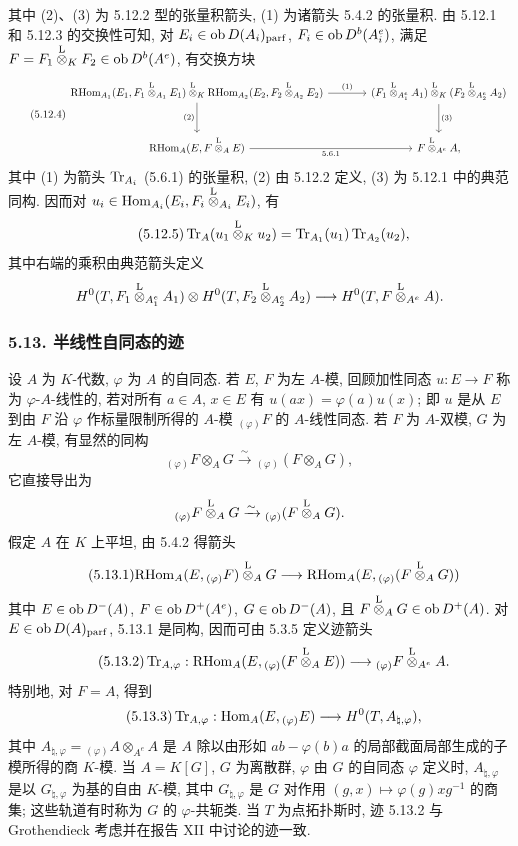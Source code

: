 其中 (2)、(3) 为 5.12.2 型的张量积箭头, (1) 为诸箭头 5.4.2 的张量积. 由 5.12.1 和 5.12.3 的交换性可知, 对 $E_i\in\operatorname{ob} D(A_i)_{\mathrm{parf}}$, $F_i\in\operatorname{ob} D^b(A_i^e)$, 满足 $F=F_1\overset{\mathrm L}{\otimes}_KF_2\in\operatorname{ob} D^b(A^e)$, 有交换方块
\begin{equation}\tag{5.12.4}
\begin{tikzcd}[column sep=large,row sep=large]
\RHom_{A_1}(E_1,F_1\lten_{A_1}E_1)\lten_K\RHom_{A_2}(E_2,F_2\lten_{A_2}E_2) \arrow[r,"(1)"] \arrow[d,"(2)"'] & (F_1\lten_{A_1^e}A_1)\lten_K(F_2\lten_{A_2^e}A_2) \arrow[d,"(3)"]\\
\RHom_A(E,F\lten_AE) \arrow[r,"5.6.1"'] & F\lten_{A^e}A,
\end{tikzcd}
\end{equation}
其中 (1) 为箭头 $\operatorname{Tr}_{A_i}$ (5.6.1) 的张量积, (2) 由 5.12.2 定义, (3) 为 5.12.1 中的典范同构. 因而对 $u_i\in\operatorname{Hom}_{A_i}(E_i,F_i\overset{\mathrm L}{\otimes}_{A_i}E_i)$, 有
\begin{equation}\tag{5.12.5}
\operatorname{Tr}_A(u_1\overset{\mathrm L}{\otimes}_Ku_2)=\operatorname{Tr}_{A_1}(u_1)\operatorname{Tr}_{A_2}(u_2),
\end{equation}
其中右端的乘积由典范箭头定义
\[
H^0(T,F_1\overset{\mathrm L}{\otimes}_{A_1^e}A_1)\otimes H^0(T,F_2\overset{\mathrm L}{\otimes}_{A_2^e}A_2)
\longrightarrow H^0(T,F\overset{\mathrm L}{\otimes}_{A^e}A).
\]

\subsubsection*{5.13. 半线性自同态的迹}

设 $A$ 为 $K$-代数, $\varphi$ 为 $A$ 的自同态. 若 $E$, $F$ 为左 $A$-模, 回顾加性同态 $u:E\to F$ 称为 $\varphi$-$A$-线性的, 若对所有 $a\in A$, $x\in E$ 有 $u(ax)=\varphi(a)u(x)$; 即 $u$ 是从 $E$ 到由 $F$ 沿 $\varphi$ 作标量限制所得的 $A$-模 ${}_{(\varphi)}F$ 的 $A$-线性同态. 若 $F$ 为 $A$-双模, $G$ 为左 $A$-模, 有显然的同构
\[
{}_{(\varphi)}F\otimes_AG\xrightarrow{\sim}{}_{(\varphi)}(F\otimes_AG),
\]
它直接导出为
\[
{}_{(\varphi)}F\overset{\mathrm L}{\otimes}_AG\xrightarrow{\sim}{}_{(\varphi)}(F\overset{\mathrm L}{\otimes}_AG).
\]
假定 $A$ 在 $K$ 上平坦, 由 5.4.2 得箭头
\begin{equation}\tag{5.13.1}
\mathrm{RHom}_A(E,{}_{(\varphi)}F)\overset{\mathrm L}{\otimes}_AG\longrightarrow\mathrm{RHom}_A(E,{}_{(\varphi)}(F\overset{\mathrm L}{\otimes}_AG))
\end{equation}
其中 $E\in\operatorname{ob} D^-(A)$, $F\in\operatorname{ob} D^+(A^e)$, $G\in\operatorname{ob} D^-(A)$, 且 $F\overset{\mathrm L}{\otimes}_AG\in\operatorname{ob} D^+(A)$. 对 $E\in\operatorname{ob} D(A)_{\mathrm{parf}}$, 5.13.1 是同构, 因而可由 5.3.5 定义迹箭头
\begin{equation}\tag{5.13.2}
\operatorname{Tr}_{A,\varphi}:\mathrm{RHom}_A(E,{}_{(\varphi)}(F\overset{\mathrm L}{\otimes}_AE))\longrightarrow {}_{(\varphi)}F\overset{\mathrm L}{\otimes}_{A^e}A.
\end{equation}
特别地, 对 $F=A$, 得到
\begin{equation}\tag{5.13.3}
\operatorname{Tr}_{A,\varphi}:\operatorname{Hom}_A(E,{}_{(\varphi)}E)\longrightarrow H^0(T,A_{\natural,\varphi}),
\end{equation}
其中 $A_{\natural,\varphi}={}_{(\varphi)}A\otimes_{A^e}A$ 是 $A$ 除以由形如 $ab-\varphi(b)a$ 的局部截面局部生成的子模所得的商 $K$-模. 当 $A=K[G]$, $G$ 为离散群, $\varphi$ 由 $G$ 的自同态 $\varphi$ 定义时, $A_{\natural,\varphi}$ 是以 $G_{\natural,\varphi}$ 为基的自由 $K$-模, 其中 $G_{\natural,\varphi}$ 是 $G$ 对作用 $(g,x)\mapsto\varphi(g)xg^{-1}$ 的商集; 这些轨道有时称为 $G$ 的 $\varphi$-共轭类. 当 $T$ 为点拓扑斯时, 迹 5.13.2 与 Grothendieck 考虑并在报告 XII 中讨论的迹一致.

